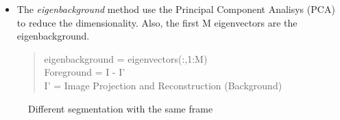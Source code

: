 \begin{itemize}
\item The \textit{eigenbackground} method use the Principal Component Analisys (PCA) to reduce the dimensionality. Also, the first M eigenvectors are the eigenbackground.
\begin{quote}
		eigenbackground = eigenvectors(:,1:M) \\
		Foreground = I - I' \\ 
		I' = Image Projection and Reconstruction (Background) \\
\end{quote}
\end{itemize}

\begin{figure}[h]
  \centering              
  \caption{Different segmentation with the same frame }
\end{figure}

